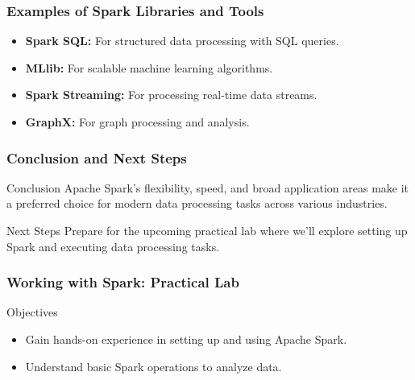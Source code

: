 \documentclass{beamer}
\begin{document}
\begin{frame}[fragile]
    \frametitle{Examples of Spark Libraries and Tools}
    \begin{itemize}
        \item \textbf{Spark SQL:} For structured data processing with SQL queries.
        \item \textbf{MLlib:} For scalable machine learning algorithms.
        \item \textbf{Spark Streaming:} For processing real-time data streams.
        \item \textbf{GraphX:} For graph processing and analysis.
    \end{itemize}
\end{frame}

\begin{frame}[fragile]
    \frametitle{Conclusion and Next Steps}
    \begin{block}{Conclusion}
        Apache Spark's flexibility, speed, and broad application areas make it a preferred choice for modern data processing tasks across various industries.
    \end{block}
    
    \begin{block}{Next Steps}
        Prepare for the upcoming practical lab where we'll explore setting up Spark and executing data processing tasks.
    \end{block}
\end{frame}

\begin{frame}
    \frametitle{Working with Spark: Practical Lab}
    \begin{block}{Objectives}
        \begin{itemize}
            \item Gain hands-on experience in setting up and using Apache Spark.
            \item Understand basic Spark operations to analyze data.
        \end{itemize}
    \end{block}
\end{frame}
\end{document}
